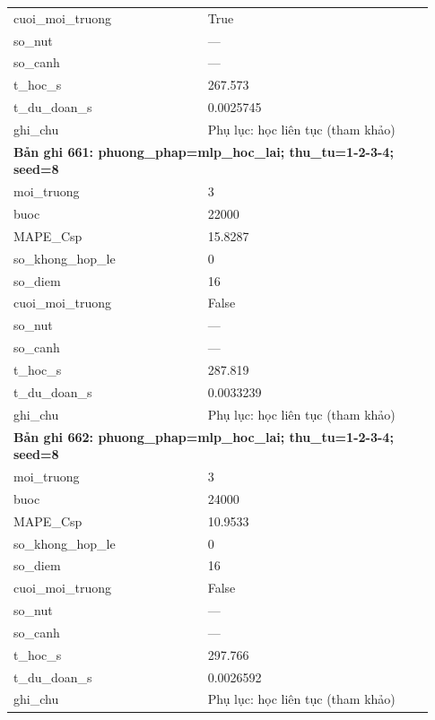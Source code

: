 \begin{longtable}{p{0.43\linewidth}p{0.50\linewidth}}
cuoi\_\allowbreak moi\_\allowbreak truong & True \\
so\_\allowbreak nut & — \\
so\_\allowbreak canh & — \\
t\_\allowbreak hoc\_\allowbreak s & 267.573 \\
t\_\allowbreak du\_\allowbreak doan\_\allowbreak s & 0.0025745 \\
ghi\_\allowbreak chu & Phụ lục: học liên tục (tham khảo) \\
\midrule
\multicolumn{2}{p{0.95\linewidth}}{\textbf{Bản ghi 661: phuong\_phap=mlp\_hoc\_lai; thu\_tu=1-2-3-4; seed=8}} \\
moi\_\allowbreak truong & 3 \\
buoc & 22000 \\
MAPE\_\allowbreak Csp & 15.8287 \\
so\_\allowbreak khong\_\allowbreak hop\_\allowbreak le & 0 \\
so\_\allowbreak diem & 16 \\
cuoi\_\allowbreak moi\_\allowbreak truong & False \\
so\_\allowbreak nut & — \\
so\_\allowbreak canh & — \\
t\_\allowbreak hoc\_\allowbreak s & 287.819 \\
t\_\allowbreak du\_\allowbreak doan\_\allowbreak s & 0.0033239 \\
ghi\_\allowbreak chu & Phụ lục: học liên tục (tham khảo) \\
\midrule
\multicolumn{2}{p{0.95\linewidth}}{\textbf{Bản ghi 662: phuong\_phap=mlp\_hoc\_lai; thu\_tu=1-2-3-4; seed=8}} \\
moi\_\allowbreak truong & 3 \\
buoc & 24000 \\
MAPE\_\allowbreak Csp & 10.9533 \\
so\_\allowbreak khong\_\allowbreak hop\_\allowbreak le & 0 \\
so\_\allowbreak diem & 16 \\
cuoi\_\allowbreak moi\_\allowbreak truong & False \\
so\_\allowbreak nut & — \\
so\_\allowbreak canh & — \\
t\_\allowbreak hoc\_\allowbreak s & 297.766 \\
t\_\allowbreak du\_\allowbreak doan\_\allowbreak s & 0.0026592 \\
ghi\_\allowbreak chu & Phụ lục: học liên tục (tham khảo) \\

\end{longtable}
